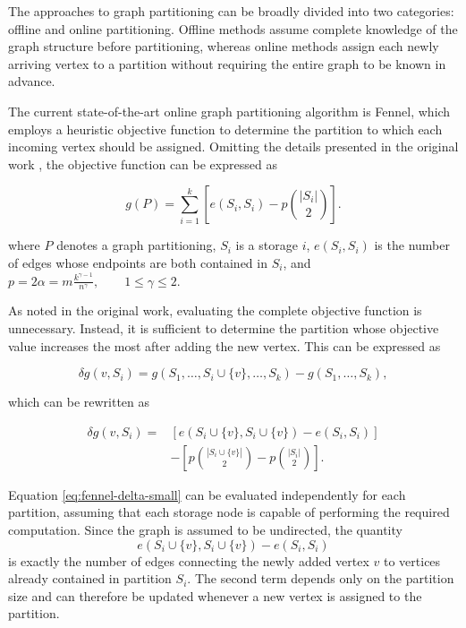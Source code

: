The approaches to graph partitioning can be broadly divided into two categories: offline and online partitioning. Offline methods assume complete knowledge of the graph structure before partitioning, whereas online methods assign each newly arriving vertex to a partition without requiring the entire graph to be known in advance.

The current state-of-the-art online graph partitioning algorithm is Fennel, which employs a heuristic objective function to determine the partition to which each incoming vertex should be assigned. Omitting the details presented in the original work \cite{Fennel}, the objective function can be expressed as

\begin{equation*}
    g(P)=\sum_{i=1}^k\left[e(S_i,S_i)-p\binom{|S_i|}{2}\right].
\end{equation*}

where $P$ denotes a graph partitioning, $S_i$ is a storage $i$, $e(S_i,S_i)$ is the number of edges whose endpoints are both contained in $S_i$, and $ p=2\alpha=m\frac{k^{\gamma-1}}{n^\gamma}, \qquad 1\leq\gamma\leq2$.

As noted in the original work, evaluating the complete objective function is unnecessary. Instead, it is sufficient to determine the partition whose objective value increases the most after adding the new vertex. This can be expressed as

\begin{equation}
\delta g(v,S_i)=g(S_1,\ldots,S_i\cup\{v\},\ldots,S_k)-g(S_1,\ldots,S_k),
\label{eq:fennel-delta-big}
\end{equation}

which can be rewritten as

\begin{equation}
\begin{aligned}
\delta g(v,S_i)
={}&
\left[e(S_i\cup\{v\},S_i\cup\{v\})-e(S_i,S_i)\right] \\
&-
\left[
p\binom{|S_i\cup\{v\}|}{2}
-
p\binom{|S_i|}{2}
\right].
\end{aligned}
\label{eq:fennel-delta-small}
\end{equation}

Equation \ref{eq:fennel-delta-small} can be evaluated independently for each partition, assuming that each storage node is capable of performing the required computation. Since the graph is assumed to be undirected, the quantity
$$
e(S_i\cup\{v\},S_i\cup\{v\})-e(S_i,S_i)
$$
is exactly the number of edges connecting the newly added vertex $v$ to vertices already contained in partition $S_i$. The second term depends only on the partition size and can therefore be updated whenever a new vertex is assigned to the partition.


